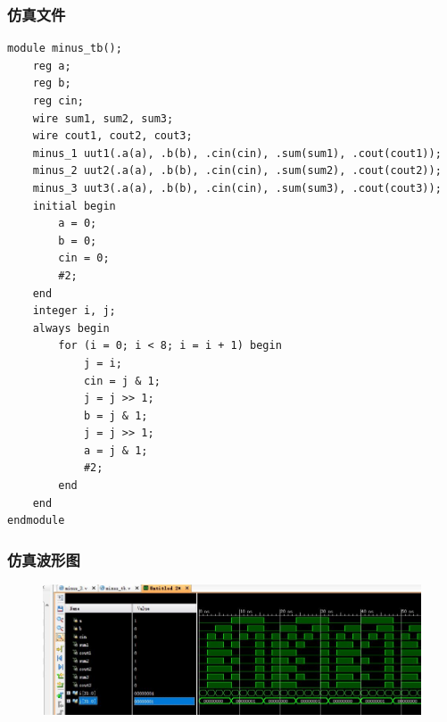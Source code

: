 \documentclass{article}
\begin{document}
\subsubsection{仿真文件}

\begin{lstlisting}
module minus_tb();
    reg a;
    reg b;
    reg cin;    
    wire sum1, sum2, sum3;
    wire cout1, cout2, cout3;    
    minus_1 uut1(.a(a), .b(b), .cin(cin), .sum(sum1), .cout(cout1));
    minus_2 uut2(.a(a), .b(b), .cin(cin), .sum(sum2), .cout(cout2));
    minus_3 uut3(.a(a), .b(b), .cin(cin), .sum(sum3), .cout(cout3));
    initial begin
        a = 0;
        b = 0;
        cin = 0;
        #2;
    end    
    integer i, j;
    always begin
        for (i = 0; i < 8; i = i + 1) begin
            j = i;
            cin = j & 1;
            j = j >> 1;
            b = j & 1;
            j = j >> 1;
            a = j & 1;
            #2;
        end
    end
endmodule
\end{lstlisting}

\newpage

\subsubsection{仿真波形图}

\begin{figure}[!hbp]
  \centering
  \includegraphics[scale=0.6]{s1.jpg}
\end{figure}
\end{document}
